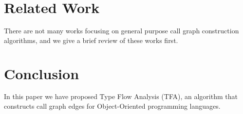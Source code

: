 \documentclass{fac}
\begin{document}
\section{Related Work}\label{sec:related-work}
There are not many works focusing on general purpose call graph construction algorithms, and we give a brief review of these works first.

\section{Conclusion}\label{sec:conclusion}
In this paper we have proposed Type Flow Analysis (TFA), an algorithm that constructs call graph edges for Object-Oriented programming languages.

\label{lastpage}
\end{document}
